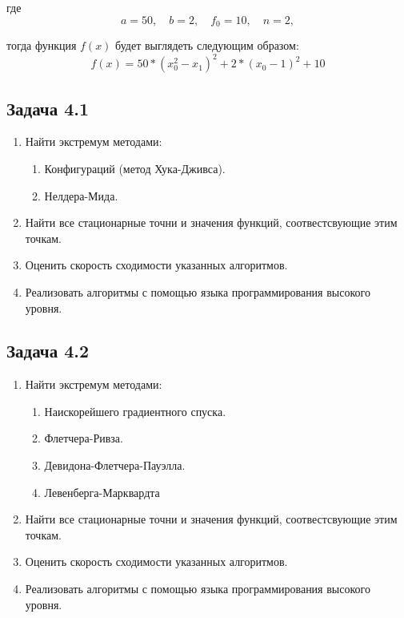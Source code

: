 \documentclass[a4paper, 12pt]{article}   	%
\begin{document}
    где 
    \begin{equation}
        a = 50, \quad b = 2, \quad f_0 = 10, \quad n = 2,
    \end{equation}
    
    тогда функция $f(x)$ будет выглядеть следующим образом:
    \begin{equation}
        f(x) = 50 * (x_0^2 - x_1)^2 + 2 * (x_0 - 1)^2 + 10
    \end{equation}

\subsection{Задача 4.1}
    \begin{enumerate}
        \item Найти экстремум методами:
        \begin{enumerate}
            \item Конфигураций (метод Хука-Дживса).
            \item Нелдера-Мида.
        \end{enumerate}
        \item Найти все стационарные точни и значения функций, соотвестсвующие этим точкам. 
        \item Оценить скорость сходимости указанных алгоритмов.
        \item Реализовать алгоритмы с помощью языка программирования высокого уровня.
    \end{enumerate}
    
    
\subsection{Задача 4.2}
    \begin{enumerate}
        \item Найти экстремум методами:
        \begin{enumerate}
            \item Наискорейшего градиентного спуска.
            \item Флетчера-Ривза.
            \item Девидона-Флетчера-Пауэлла.
            \item Левенберга-Марквардта
        \end{enumerate}
        \item Найти все стационарные точни и значения функций, соотвестсвующие этим точкам. 
        \item Оценить скорость сходимости указанных алгоритмов.
        \item Реализовать алгоритмы с помощью языка программирования высокого уровня.
    \end{enumerate}
\end{document}
